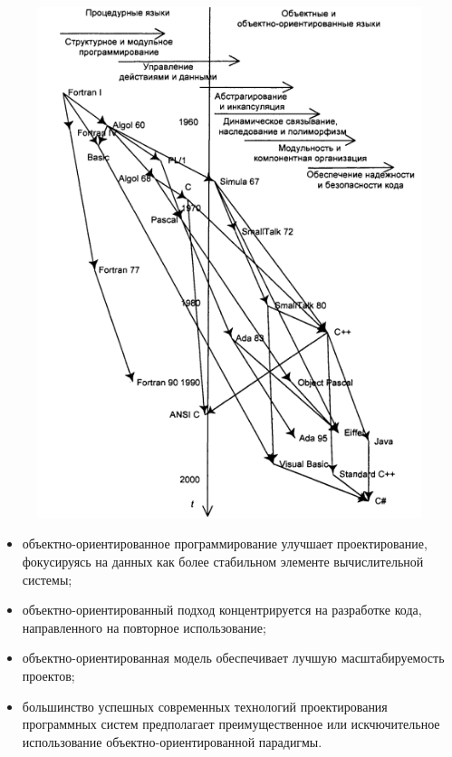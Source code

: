 \documentclass{beamer}
\begin{document}
\begin{frame}[t]
\begin{figure}[h]
\centering
\includegraphics[scale=0.5]{images/lec04-pic03.png}
\end{figure}
\end{frame}

\begin{frame}
\begin{itemize}
\item объектно-ориентированное программирование улучшает проектирование, фокусируясь на данных как более стабильном элементе вычислительной системы; 
\item объектно-ориентированный подход концентрируется на разработке кода, направленного на повторное использование;
\item объектно-ориентированная модель обеспечивает лучшую масштабируемость проектов;
\item большинство успешных современных технологий
проектирования программных систем предполагает преимущественное или
искчючительное использование объектно-ориентированной парадигмы.
\end{itemize}
\end{frame}
\end{document}
